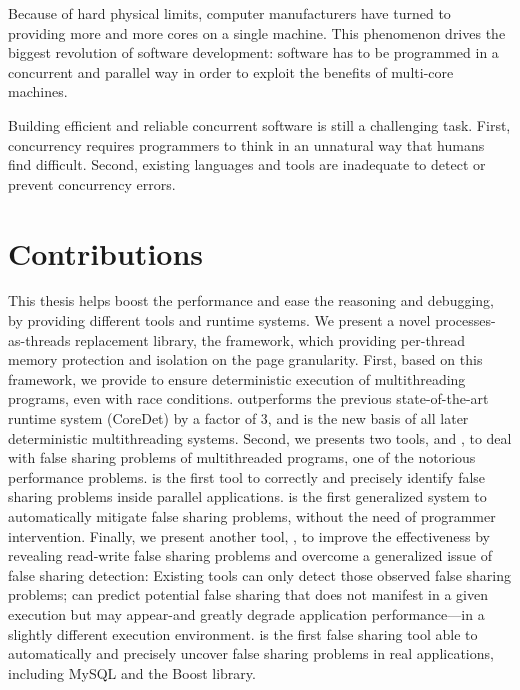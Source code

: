 \label{chapter:conclusion}

Because of hard physical limits, computer manufacturers have turned to providing more and more cores on a single machine. This phenomenon drives the biggest revolution of software development: software has to be programmed in a concurrent and parallel way in order to exploit the benefits of multi-core machines.

Building efficient and reliable concurrent software is still a challenging task. First, concurrency requires programmers to think in an unnatural way that humans find difficult.  Second, existing languages and tools are inadequate to detect or prevent concurrency errors.  

\section{Contributions}

This thesis helps boost the performance and ease the reasoning and debugging, by providing different tools and runtime systems. We present a novel processes-as-threads replacement library, the \sheriff{} framework, which providing per-thread memory protection and isolation on the page granularity. First, based on this framework, we provide \dthreads{} to ensure deterministic execution of multithreading programs, even with race conditions. \dthreads{} outperforms the previous state-of-the-art runtime system (CoreDet) by a factor of 3, and is the new basis of all later deterministic multithreading systems. Second, we presents two tools, \SheriffDetect{} and \SheriffProtect{}, to deal with false sharing problems of multithreaded programs, one of the notorious performance problems. \SheriffDetect{} is the first tool to correctly and precisely identify false sharing problems inside parallel applications. \SheriffProtect{} is the first generalized system to automatically mitigate false sharing problems, without the need of programmer intervention.  Finally, we present another tool, \predator{}, to improve the effectiveness by revealing read-write false sharing problems and overcome a generalized issue of false sharing detection: Existing tools can only detect those observed false sharing problems; \Predator{} can predict potential false sharing that does not manifest in a given execution but may appear-and greatly degrade application performance—in a slightly different execution environment. \Predator{} is the first false sharing tool able to automatically and precisely uncover false sharing problems in real applications, including MySQL and the Boost library.

